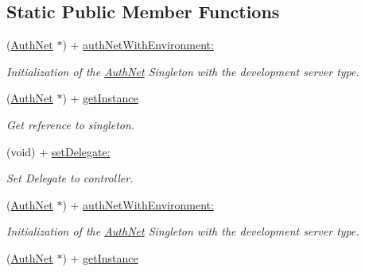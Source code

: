 \subsection*{Static Public Member Functions}
\begin{DoxyCompactItemize}
\item 
(\hyperlink{interface_auth_net}{AuthNet} $\ast$) + \hyperlink{interface_auth_net_a786b06faf840607cc5dd722ab101394a}{authNetWithEnvironment:}
\begin{DoxyCompactList}\small\item\em Initialization of the \hyperlink{interface_auth_net}{AuthNet} Singleton with the development server type. \item\end{DoxyCompactList}\item 
\hypertarget{interface_auth_net_a0f038013f30dbc3cd4980c3bf038310d}{
(\hyperlink{interface_auth_net}{AuthNet} $\ast$) + \hyperlink{interface_auth_net_a0f038013f30dbc3cd4980c3bf038310d}{getInstance}}
\label{interface_auth_net_a0f038013f30dbc3cd4980c3bf038310d}

\begin{DoxyCompactList}\small\item\em Get reference to singleton. \item\end{DoxyCompactList}\item 
(void) + \hyperlink{interface_auth_net_aea5da974fc41578357c9919df5d34fee}{setDelegate:}
\begin{DoxyCompactList}\small\item\em Set Delegate to controller. \item\end{DoxyCompactList}\item 
(\hyperlink{interface_auth_net}{AuthNet} $\ast$) + \hyperlink{interface_auth_net_a786b06faf840607cc5dd722ab101394a}{authNetWithEnvironment:}
\begin{DoxyCompactList}\small\item\em Initialization of the \hyperlink{interface_auth_net}{AuthNet} Singleton with the development server type. \item\end{DoxyCompactList}\item 
\hypertarget{interface_auth_net_a0f038013f30dbc3cd4980c3bf038310d}{
(\hyperlink{interface_auth_net}{AuthNet} $\ast$) + \hyperlink{interface_auth_net_a0f038013f30dbc3cd4980c3bf038310d}{getInstance}}
\label{interface_auth_net_a0f038013f30dbc3cd4980c3bf038310d}


\end{DoxyCompactItemize}
